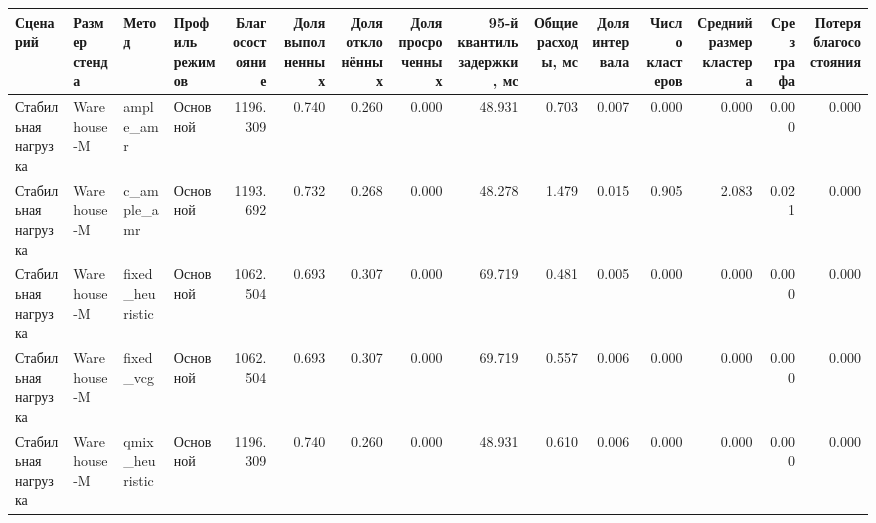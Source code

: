 \begin{tabular}{llllrrrrrrrrrrr}
\toprule
 Сценарий & Размер стенда & Метод & Профиль режимов & Благосостояние & Доля выполненных & Доля отклонённых & Доля просроченных & 95-й квантиль задержки, мс & Общие расходы, мс & Доля интервала & Число кластеров & Средний размер кластера & Срез графа & Потеря благосостояния \\
\midrule
 Стабильная нагрузка & Warehouse-M & ample_amr & Основной & 1196.309 & 0.740 & 0.260 & 0.000 & 48.931 & 0.703 & 0.007 & 0.000 & 0.000 & 0.000 & 0.000 \\
 Стабильная нагрузка & Warehouse-M & c_ample_amr & Основной & 1193.692 & 0.732 & 0.268 & 0.000 & 48.278 & 1.479 & 0.015 & 0.905 & 2.083 & 0.021 & 0.000 \\
 Стабильная нагрузка & Warehouse-M & fixed_heuristic & Основной & 1062.504 & 0.693 & 0.307 & 0.000 & 69.719 & 0.481 & 0.005 & 0.000 & 0.000 & 0.000 & 0.000 \\
 Стабильная нагрузка & Warehouse-M & fixed_vcg & Основной & 1062.504 & 0.693 & 0.307 & 0.000 & 69.719 & 0.557 & 0.006 & 0.000 & 0.000 & 0.000 & 0.000 \\
 Стабильная нагрузка & Warehouse-M & qmix_heuristic & Основной & 1196.309 & 0.740 & 0.260 & 0.000 & 48.931 & 0.610 & 0.006 & 0.000 & 0.000 & 0.000 & 0.000 \\
\bottomrule
\end{tabular}
